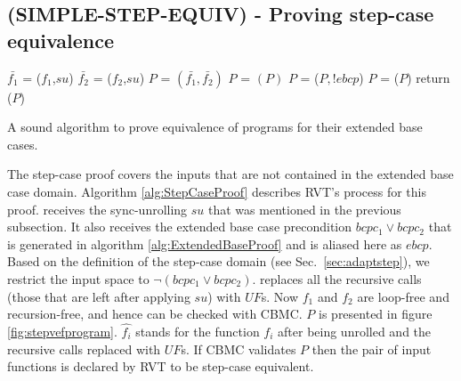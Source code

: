 \subsection{(SIMPLE-STEP-EQUIV) - Proving step-case equivalence}
\label{sec:SIMPLE-STEP-EQUIV}
\noindent
\begin{algorithm}
\begin{minipage}{\linewidth}
\begin{algorithmic}[1]
	\State$\bar{f_1}$ = ($f_1$,$su$)
	\State$\bar{f_2}$ = ($f_2$,$su$)
	\State $P$ = $(\bar{f_1},\bar{f_2})$
	\State $P$ = $(P)$
	\State $P$ = ($P,!ebcp$)
    \State $P$ = ($P$)
    \State return ($P$) 
	\EndFunction
\end{algorithmic}
\end{minipage}
\caption{A sound algorithm to prove equivalence of programs for their extended base cases.}
\label{alg:StepCaseProof}
\end{algorithm}
The step-case proof covers the inputs that are not contained in the extended base case domain. Algorithm \ref{alg:StepCaseProof} describes RVT's process for this proof.
 receives the sync-unrolling $su$ that was mentioned in the previous subsection. It also receives the extended base case precondition $bcpc_1 \lor bcpc_2$ that is generated in algorithm \ref{alg:ExtendedBaseProof} and is aliased here as $ebcp$. Based on the definition of the step-case domain (see Sec.~\ref{sec:adaptstep}), we restrict the input space to $\lnot(bcpc_1 \lor bcpc_2)$.   replaces all the recursive calls (those that are left after applying $su$) with $UF$s. Now $f_1$ and $f_2$ are loop-free and recursion-free, and hence can be checked with CBMC. $P$ is presented in figure \ref{fig:stepvefprogram}. $\hat{f_i}$ stands for the function $f_i$ after being unrolled and the recursive calls replaced with $UF$s. If CBMC validates $P$ then the pair of input functions is declared by RVT to be step-case equivalent. 
